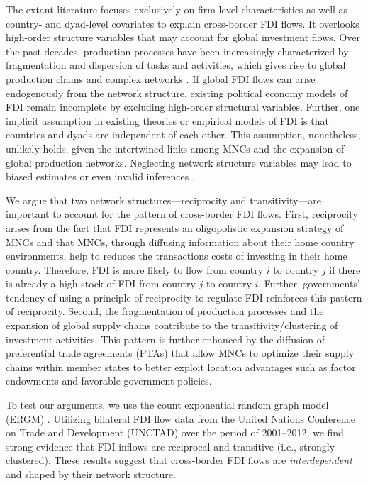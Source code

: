 \documentclass[reqno,onecolumn,letterpaper,12pt]{article}
\begin{document}
The extant literature focuses exclusively on firm-level characteristics as well as country- and dyad-level covariates to explain cross-border FDI flows. It overlooks high-order structure variables that may account for global investment flows. Over the past decades, production processes have been increasingly characterized by fragmentation and dispersion of tasks and activities, which gives rise to global production chains and complex networks \citep[~xxi]{UNCTAD:2013}. If global FDI flows can arise endogenously from the network structure, existing political economy models of FDI remain incomplete by excluding high-order structural variables. Further, one implicit assumption in existing theories or empirical models of FDI is that countries and dyads are independent of each other. This assumption, nonetheless, unlikely holds, given the intertwined links among MNCs and the expansion of global production networks. Neglecting network structure variables may lead to biased estimates or even invalid inferences \citep{cranmer2011inferential}.

We argue that two network structures---reciprocity and transitivity---are important to account for the pattern of cross-border FDI flows. First, reciprocity arises from the fact that FDI represents an oligopolistic expansion strategy of MNCs and that MNCs, through diffusing information about their home country environments, help to reduces the transactions costs of investing in their home country. Therefore, FDI is more likely to flow from country $i$ to country $j$ if there is already a high stock of FDI from country $j$ to country $i$. Further, governments' tendency of using a principle of reciprocity to regulate FDI reinforces this pattern of reciprocity. Second, the fragmentation of production processes and the expansion of global supply chains contribute to the transitivity/clustering of investment activities. This pattern is further enhanced by the diffusion of preferential trade agreements (PTAs) that allow MNCs to optimize their supply chains within member states to better exploit location advantages such as factor endowments and favorable government policies.

To test our arguments, we use the count exponential random graph model (ERGM) \citep{krivitsky2012exponential}. Utilizing bilateral FDI flow data from the United Nations Conference on Trade and Development (UNCTAD) over the period of 2001--2012, we find strong evidence that FDI inflows are reciprocal and transitive (i.e., strongly clustered). These results suggest that cross-border FDI flows are \textit{interdependent} and shaped by their network structure. %
\end{document}
